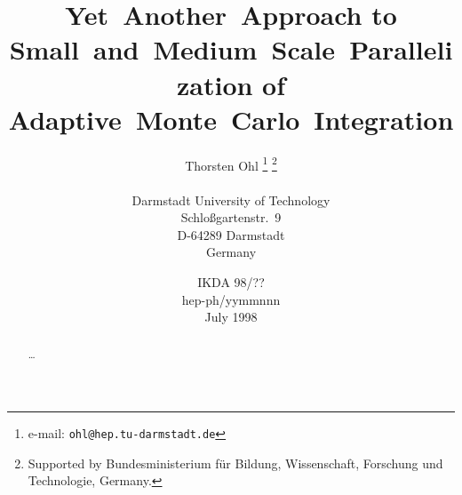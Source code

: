 \documentclass[12pt,a4paper]{article}
\begin{document}
\title{%
  Yet~Another~Approach to Small~and~Medium~Scale~Parallelization
  of Adaptive~Monte~Carlo~Integration}
\author{%
  Thorsten Ohl%
    \thanks{e-mail: \texttt{ohl@hep.tu-darmstadt.de}}
  {}\thanks{Supported by Bundesministerium f\"ur Bildung,
       Wissenschaft, Forschung und Technologie, Germany.}\\
  \hfil \\
  Darmstadt University of Technology  \\
  Schlo\ss gartenstr.~9 \\
  D-64289 Darmstadt \\
  Germany}
\date{%
  IKDA 98/??\\
  hep-ph/yymmnnn\\
  July 1998}
\maketitle
\begin{abstract}
  \ldots
\end{abstract}
\end{document}
